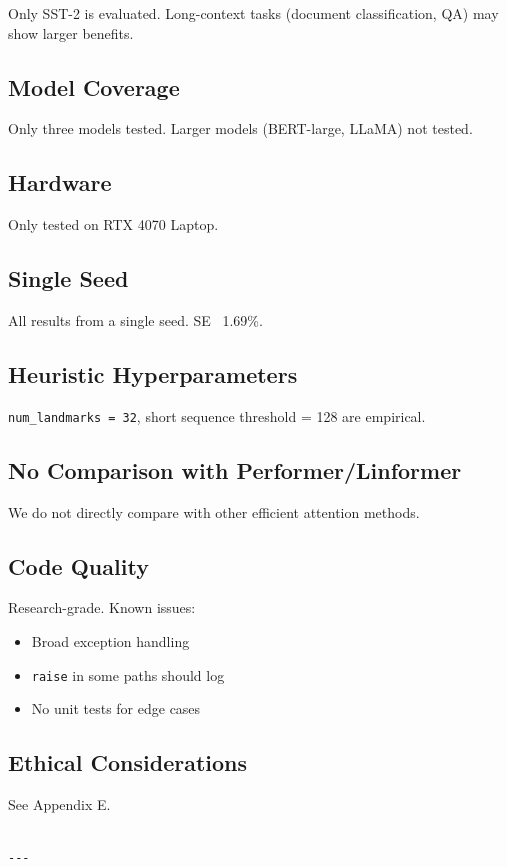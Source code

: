 Only SST-2 is evaluated. Long-context tasks (document classification, 
QA) may show larger benefits.

\subsection{Model Coverage}

Only three models tested. Larger models (BERT-large, LLaMA) not tested.

\subsection{Hardware}

Only tested on RTX 4070 Laptop.

\subsection{Single Seed}

All results from a single seed. SE ~1.69\%.

\subsection{Heuristic Hyperparameters}

\texttt{num\_landmarks = 32}, short sequence threshold = 128 are empirical.

\subsection{No Comparison with Performer/Linformer}

We do not directly compare with other efficient attention methods.

\subsection{Code Quality}

Research-grade. Known issues:
\begin{itemize}
\item Broad exception handling
\item \texttt{raise} in some paths should log
\item No unit tests for edge cases

\end{itemize}
\subsection{Ethical Considerations}

See Appendix E.
\begin{lstlisting}

---
\end{lstlisting}